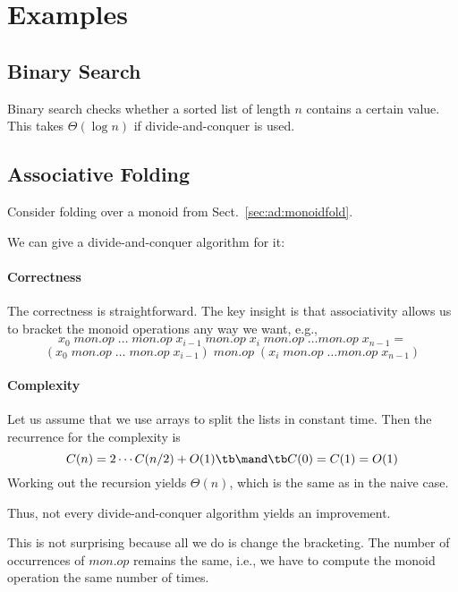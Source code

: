 \section{Examples}

\subsection{Binary Search}

Binary search checks whether a sorted list of length $n$ contains a certain value.
This takes $\Theta(\log n)$ if divide-and-conquer is used.

\subsection{Associative Folding}\label{sec:ad:monoidfold:divide}

Consider folding over a monoid from Sect.~\ref{sec:ad:monoidfold}.

We can give a divide-and-conquer algorithm for it:

\begin{acode}
\end{acode}

\paragraph{Correctness}
The correctness is straightforward.
The key insight is that associativity allows us to bracket the monoid operations any way we want, e.g.,
\[x_0 \;mon.op\;\ldots \;mon.op\; x_{i-1} \;mon.op\; x_i \;mon.op\; \ldots mon.op\; x_{n-1} =\]
\[(x_0 \;mon.op\; \ldots \;mon.op\; x_{i-1}) \;mon.op\; (x_i \;mon.op\; \ldots mon.op\; x_{n-1}) \]

\paragraph{Complexity}
Let us assume that we use arrays to split the lists in constant time.
Then the recurrence for the complexity is
 \[C(n)=2\cdots C(n/2)+O(1) \tb\mand\tb C(0)=C(1)= O(1)\]
Working out the recursion yields $\Theta(n)$, which is the same as in the naive case.

Thus, not every divide-and-conquer algorithm yields an improvement.

This is not surprising because all we do is change the bracketing.
The number of occurrences of $mon.op$ remains the same, i.e., we have to compute the monoid operation the same number of times.